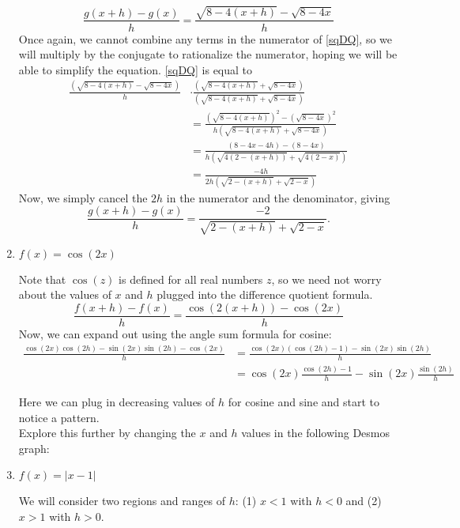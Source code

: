 \documentclass{ximera}
\begin{document}
\begin{example}
\begin{enumerate}
\begin{explanation}
  \begin{equation}\label{sqDQ}
   \frac{g(x+h) - g(x)}{h} = \frac{\sqrt{8-4(x+h)} - \sqrt{8-4x}}{h}
  \end{equation}
  Once again, we cannot combine any terms in the numerator of \eqref{sqDQ}, so we will multiply by the conjugate to rationalize the numerator, hoping we will be able to simplify the equation. \eqref{sqDQ} is equal to
  \begin{align*}
 \frac{(\sqrt{8-4(x+h)} - \sqrt{8-4x})}{h} &\cdot \frac{(\sqrt{8-4(x+h)} + \sqrt{8-4x})}{(\sqrt{8-4(x+h)} + \sqrt{8-4x})} \\
  &=  \frac{(\sqrt{8-4(x+h)})^2 - (\sqrt{8-4x})^2}{h(\sqrt{8-4(x+h)} + \sqrt{8-4x})} \\
  &= \frac{(8-4x-4h) - (8-4x)}{h(\sqrt{4(2-(x+h))} + \sqrt{4(2-x)})}\\
  &= \frac{-4h}{2h(\sqrt{2-(x+h)} + \sqrt{2-x})}
  \end{align*}
  Now, we simply cancel the $2h$ in the numerator and the denominator, giving
  $$ \frac{g(x+h) - g(x)}{h} = \frac{-2}{\sqrt{2-(x+h)} + \sqrt{2-x}}.$$
  \end{explanation}
  \item $f(x) = \cos(2x)$
 \\
 \begin{explanation}
 Note that $\cos(z)$ is defined for all real numbers $z$, so we need not worry about the values of $x$ and $h$ plugged into the difference quotient formula.
 \begin{equation*}\label{cosDQ}
 \frac{f(x+h) - f(x)}{h} = \frac{\cos(2(x+h)) - \cos(2x)}{h}
 \end{equation*}
 Now, we can expand out using the angle sum formula for cosine:
 \begin{align*}
 \frac{\cos(2x)\cos(2h)-\sin(2x)\sin(2h) - \cos(2x)}{h} 
 &= \frac{\cos(2x)(\cos(2h)-1)- \sin(2x)\sin(2h)}{h} \\
 &=  \cos(2x)\frac{\cos(2h)-1}{h}- \sin(2x)\frac{\sin(2h)}{h}
 \end{align*}
 
Here we can plug in decreasing values of $h$ for cosine and sine and start to notice a pattern.\\
Explore this further by changing the $x$ and $h$ values in the following Desmos graph:
 \end{explanation}
  \item $f(x) = |x-1|$ %
  \\
   \begin{explanation}
   We will consider two regions and ranges of $h$: (1) $x < 1$ with $h<0$ and (2) $x > 1$ with $h>0$. 
   

\end{explanation}
\end{enumerate}
\end{example}
\end{document}
